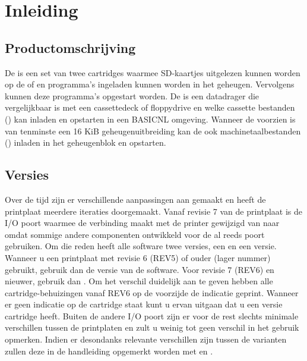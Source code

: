 \chapter{Inleiding}
\chapterpreamble

%
%
%
\section{Productomschrijving}

De \product is een set van twee cartridges waarmee SD-kaartjes uitgelezen kunnen worden op de  of  en programma's ingeladen kunnen worden in het geheugen. Vervolgens kunnen deze programma's opgestart worden. De \product is een datadrager die vergelijkbaar is met een cassettedeck of floppydrive en welke cassette bestanden (\cas) kan inladen en opstarten in een BASICNL omgeving. Wanneer de  voorzien is van tenminste een 16 KiB geheugenuitbreiding kan de  ook machinetaalbestanden (\prg) inladen in het geheugenblok  en opstarten.

%
%
%
\section{Versies}
Over de tijd zijn er verschillende aanpassingen aan \product gemaakt en heeft de printplaat meerdere iteraties doorgemaakt. Vanaf revisie 7 van de printplaat is de I/O poort waarmee de \product verbinding maakt met de printer gewijzigd van  naar  omdat sommige andere componenten ontwikkeld voor de \pc al reeds poort  gebruiken. Om die reden heeft alle software twee versies, een  en een  versie. Wanneer u een printplaat met revisie 6 (REV5) of ouder (lager nummer) gebruikt, gebruik dan de  versie van de software. Voor revisie 7 (REV6) en nieuwer, gebruik dan . Om het verschil duidelijk aan te geven hebben alle cartridge-behuizingen vanaf REV6 op de voorzijde de indicatie  geprint. Wanneer er geen indicatie op de cartridge staat kunt u ervan uitgaan dat u een versie  cartridge heeft. Buiten de andere I/O poort zijn er voor de rest slechts minimale verschillen tussen de printplaten en zult u weinig tot geen verschil in het gebruik opmerken. Indien er desondanks relevante verschillen zijn tussen de varianten zullen deze in de handleiding opgemerkt worden met \faLocationArrow{} en \faLocationArrow{}.



